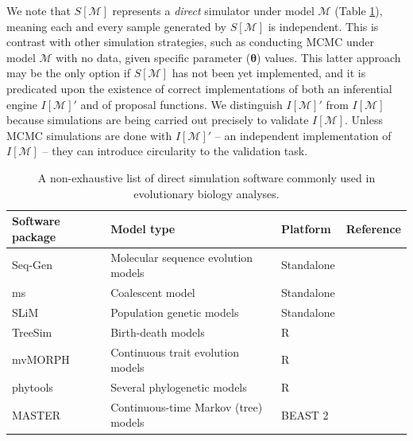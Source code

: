 \documentclass[oneside]{article}
\begin{document}
We note that $S[\mathcal{M}]$ represents a \emph{direct} simulator under
model $\mathcal{M}$ (Table \ref{tab:sim}), meaning each and every sample
generated by $S[\mathcal{M}]$ is
independent.
This is contrast with other simulation strategies, such as conducting
MCMC under model $\mathcal{M}$ with no data, given specific parameter
($\boldsymbol{\theta}$) values.
This latter approach may be the only option if $S[\mathcal{M}]$ has not
been yet implemented, and it is predicated upon the existence of correct
implementations of both an inferential engine $I[\mathcal{M}]'$ and of
proposal functions.
We distinguish $I[\mathcal{M}]'$ from $I[\mathcal{M}]$ because
simulations are being carried out precisely to validate $I[\mathcal{M}]$.
Unless MCMC simulations are done with $I[\mathcal{M}]'$ -- an independent
implementation of $I[\mathcal{M}]$ -- they can introduce circularity 
to the validation task.

\begin{center}
  \begin{table}
  \caption{A non-exhaustive list of direct simulation software commonly used in evolutionary
    biology analyses.}
  \label{tab:sim}
  \centering
  \begin{tabular}{ p{0.7in} | p{1.3in} | p{1in} | p{1.1in} }
    \hline
    Software package & Model type & Platform & Reference \\
    \hline  
    Seq-Gen & Molecular sequence evolution models & Standalone & \citealp{rambaut97} \\
    ms & Coalescent model & Standalone & \citealp{hudson02}\\
    SLiM & Population genetic models & Standalone & \citealp{haller19}\\
    TreeSim & Birth-death models & R & \citealp{stadler11}\\
    mvMORPH & Continuous trait evolution models & R &
                                                      \citealp{clavel15}\\
    phytools & Several phylogenetic models & R & \citealp{revell12}\\
    MASTER & Continuous-time Markov (tree) models & BEAST 2 & \citealp{vaughan13}\\
    \hline
  \end{tabular}
  \end{table}
\end{center}

\end{document}
